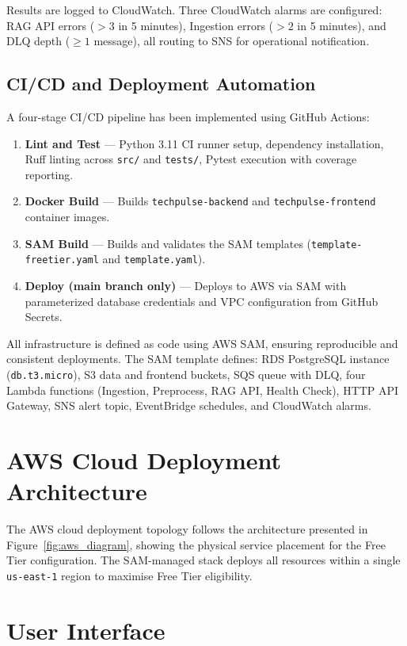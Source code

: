 Results are logged to CloudWatch. Three CloudWatch alarms are configured: RAG API errors ($>3$ in 5 minutes), Ingestion errors ($>2$ in 5 minutes), and DLQ depth ($\geq 1$ message), all routing to SNS for operational notification.

\subsection{CI/CD and Deployment Automation}

A four-stage CI/CD pipeline has been implemented using GitHub Actions:

\begin{enumerate}[leftmargin=0.5in]
  \item \textbf{Lint and Test} --- Python 3.11 CI runner setup, dependency installation, Ruff linting across \texttt{src/} and \texttt{tests/}, Pytest execution with coverage reporting.
  \item \textbf{Docker Build} --- Builds \texttt{techpulse-backend} and \texttt{techpulse-frontend} container images.
  \item \textbf{SAM Build} --- Builds and validates the SAM templates (\texttt{template-freetier.yaml} and \texttt{template.yaml}).
  \item \textbf{Deploy (main branch only)} --- Deploys to AWS via SAM with parameterized database credentials and VPC configuration from GitHub Secrets.
\end{enumerate}

All infrastructure is defined as code using AWS SAM, ensuring reproducible and consistent deployments. The SAM template defines: RDS PostgreSQL instance (\texttt{db.t3.micro}), S3 data and frontend buckets, SQS queue with DLQ, four Lambda functions (Ingestion, Preprocess, RAG API, Health Check), HTTP API Gateway, SNS alert topic, EventBridge schedules, and CloudWatch alarms.

\section{AWS Cloud Deployment Architecture}
\label{sec:cloud_arch}

The AWS cloud deployment topology follows the architecture presented in Figure~\ref{fig:aws_diagram}, showing the physical service placement for the Free Tier configuration. The SAM-managed stack deploys all resources within a single \texttt{us-east-1} region to maximise Free Tier eligibility.

\section{User Interface}
\label{sec:ui}

